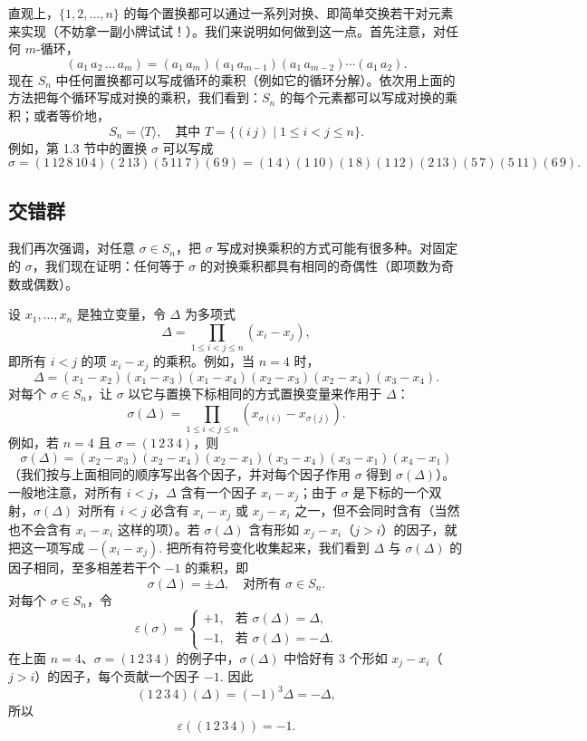直观上，\(\{1, 2, \ldots, n\}\) 的每个置换都可以通过一系列对换、即简单交换若干对元素来实现（不妨拿一副小牌试试！）。我们来说明如何做到这一点。首先注意，对任何 \(m\)-循环，
\[
(a_1\, a_2\, \ldots\, a_m) = (a_1\, a_m)(a_1\, a_{m-1})(a_1\, a_{m-2}) \cdots (a_1\, a_2).
\]
现在 \(S_n\) 中任何置换都可以写成循环的乘积（例如它的循环分解）。依次用上面的方法把每个循环写成对换的乘积，我们看到：\(S_n\) 的每个元素都可以写成对换的乘积；或者等价地，
\[
S_n = \langle T \rangle, \quad \text{其中 } T = \{(i\, j) \mid 1 \leq i < j \leq n\}.
\]
例如，第 1.3 节中的置换 \(\sigma\) 可以写成
\[
\sigma = (1\, 12\, 8\, 10\, 4)(2\, 13)(5\, 11\, 7)(6\, 9) = (1\, 4)(1\, 10)(1\, 8)(1\, 12)(2\, 13)(5\, 7)(5\, 11)(6\, 9).
\]

\subsection*{交错群}

我们再次强调，对任意 \(\sigma \in S_n\)，把 \(\sigma\) 写成对换乘积的方式可能有很多种。对固定的 \(\sigma\)，我们现在证明：任何等于 \(\sigma\) 的对换乘积都具有相同的奇偶性（即项数为奇数或偶数）。

设 \(x_1, \ldots, x_n\) 是独立变量，令 \(\Delta\) 为多项式
\[
\Delta = \prod_{1 \leq i < j \leq n} (x_i - x_j),
\]
即所有 \(i < j\) 的项 \(x_i - x_j\) 的乘积。例如，当 \(n = 4\) 时，
\[
\Delta = (x_1 - x_2)(x_1 - x_3)(x_1 - x_4)(x_2 - x_3)(x_2 - x_4)(x_3 - x_4).
\]
对每个 \(\sigma \in S_n\)，让 \(\sigma\) 以它与置换下标相同的方式置换变量来作用于 \(\Delta\)：
\[
\sigma(\Delta) = \prod_{1 \leq i < j \leq n} (x_{\sigma(i)} - x_{\sigma(j)}).
\]
例如，若 \(n = 4\) 且 \(\sigma = (1\,2\,3\,4)\)，则
\[
\sigma(\Delta) = (x_2 - x_3)(x_2 - x_4)(x_2 - x_1)(x_3 - x_4)(x_3 - x_1)(x_4 - x_1)
\]
（我们按与上面相同的顺序写出各个因子，并对每个因子作用 \(\sigma\) 得到 \(\sigma(\Delta)\)）。一般地注意，对所有 \(i < j\)，\(\Delta\) 含有一个因子 \(x_i - x_j\)；由于 \(\sigma\) 是下标的一个双射，\(\sigma(\Delta)\) 对所有 \(i < j\) 必含有 \(x_i - x_j\) 或 \(x_j - x_i\) 之一，但不会同时含有（当然也不会含有 \(x_i - x_i\) 这样的项）。若 \(\sigma(\Delta)\) 含有形如 \(x_j - x_i\)（\(j > i\)）的因子，就把这一项写成 \(-(x_i - x_j)\). 把所有符号变化收集起来，我们看到 \(\Delta\) 与 \(\sigma(\Delta)\) 的因子相同，至多相差若干个 \(-1\) 的乘积，即
\[
\sigma(\Delta) = \pm\Delta, \quad \text{对所有 } \sigma \in S_n.
\]
对每个 \(\sigma \in S_n\)，令
\[
\varepsilon(\sigma) = \begin{cases} +1, & \text{若 } \sigma(\Delta) = \Delta, \\ -1, & \text{若 } \sigma(\Delta) = -\Delta. \end{cases}
\]
在上面 \(n = 4\)、\(\sigma = (1\,2\,3\,4)\) 的例子中，\(\sigma(\Delta)\) 中恰好有 3 个形如 \(x_j - x_i\)（\(j > i\)）的因子，每个贡献一个因子 \(-1\). 因此
\[
(1\,2\,3\,4)(\Delta) = (-1)^3 \Delta = -\Delta,
\]
所以
\[
\varepsilon((1\,2\,3\,4)) = -1.
\]


